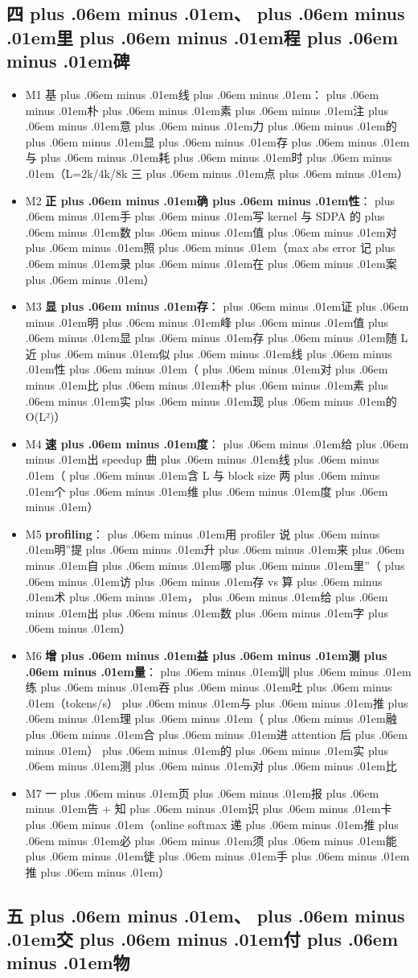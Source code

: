 \documentclass[
]{article}
\providecommand{\tightlist}{%
  \setlength{\itemsep}{0pt}\setlength{\parskip}{0pt}}
\def\zh#1{{\zhfont #1}}
\def\sym#1{{\symfont #1}}
\def\zhglue{\hskip0pt plus .06em minus .01em}
\begin{document}
\subsection{\zh{四\zhglue 、\zhglue 里\zhglue 程\zhglue 碑}}\label{ux56dbux91ccux7a0bux7891-3}

\begin{itemize}
\tightlist
\item[$\square$]
  M1 \zh{基\zhglue 线\zhglue ：\zhglue 朴\zhglue 素\zhglue 注\zhglue 意\zhglue 力\zhglue 的\zhglue 显\zhglue 存\zhglue 与\zhglue 耗\zhglue 时\zhglue （}L=2k/4k/8k \zh{三\zhglue 点\zhglue ）}
\item[$\square$]
  M2 \textbf{\zh{正\zhglue 确\zhglue 性}}\zh{：\zhglue 手\zhglue 写} kernel \zh{与} SDPA \zh{的\zhglue 数\zhglue 值\zhglue 对\zhglue 照\zhglue （}max abs error \zh{记\zhglue 录\zhglue 在\zhglue 案\zhglue ）}
\item[$\square$]
  M3 \textbf{\zh{显\zhglue 存}}\zh{：\zhglue 证\zhglue 明\zhglue 峰\zhglue 值\zhglue 显\zhglue 存\zhglue 随} L \zh{近\zhglue 似\zhglue 线\zhglue 性\zhglue （\zhglue 对\zhglue 比\zhglue 朴\zhglue 素\zhglue 实\zhglue 现\zhglue 的} O(L\sym{²})\zh{）}
\item[$\square$]
  M4 \textbf{\zh{速\zhglue 度}}\zh{：\zhglue 给\zhglue 出} speedup \zh{曲\zhglue 线\zhglue （\zhglue 含} L \zh{与} block size \zh{两\zhglue 个\zhglue 维\zhglue 度\zhglue ）}
\item[$\square$]
  M5 \textbf{profiling}\zh{：\zhglue 用} profiler \zh{说\zhglue 明}''\zh{提\zhglue 升\zhglue 来\zhglue 自\zhglue 哪\zhglue 里}''\zh{（\zhglue 访\zhglue 存} vs \zh{算\zhglue 术\zhglue ，\zhglue 给\zhglue 出\zhglue 数\zhglue 字\zhglue ）}
\item[$\square$]
  M6 \textbf{\zh{增\zhglue 益\zhglue 测\zhglue 量}}\zh{：\zhglue 训\zhglue 练\zhglue 吞\zhglue 吐\zhglue （}tokens/s\zh{）\zhglue 与\zhglue 推\zhglue 理\zhglue （\zhglue 融\zhglue 合\zhglue 进} attention \zh{后\zhglue ）\zhglue 的\zhglue 实\zhglue 测\zhglue 对\zhglue 比}
\item[$\square$]
  M7 \zh{一\zhglue 页\zhglue 报\zhglue 告} + \zh{知\zhglue 识\zhglue 卡\zhglue （}online softmax \zh{递\zhglue 推\zhglue 必\zhglue 须\zhglue 能\zhglue 徒\zhglue 手\zhglue 推\zhglue ）}
\end{itemize}

\subsection{\zh{五\zhglue 、\zhglue 交\zhglue 付\zhglue 物}}\label{ux4e94ux4ea4ux4ed8ux7269-3}
\end{document}
